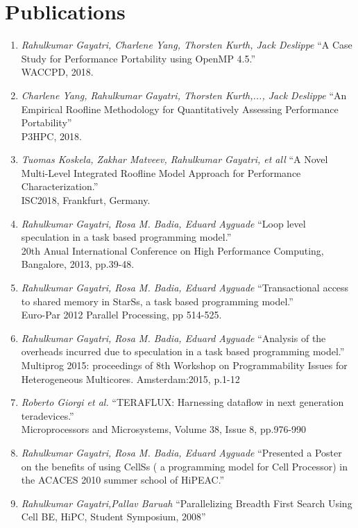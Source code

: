 \documentclass[margin]{res}
\begin{document}
\begin{resume}
\begin{center}
\begin{tabular} {|p{1cm} |p{2cm}|p{1cm}|p{3cm}|p{4cm}|  }
        \end{tabular}
    \end{center}

\section{Publications}

\begin{enumerate}
	   \item \textit{Rahulkumar Gayatri, Charlene Yang, Thorsten Kurth, Jack Deslippe}
			 \enquote{A Case Study for Performance Portability using OpenMP 4.5.} \\
             WACCPD, 2018.
%
	   \item \textit{ Charlene Yang, Rahulkumar Gayatri, Thorsten Kurth,..., Jack Deslippe}
			 \enquote{An Empirical Roofline Methodology for Quantitatively Assessing Performance Portability} \\
             P3HPC, 2018.
%
	   \item \textit{Tuomas Koskela, Zakhar Matveev, Rahulkumar Gayatri, et all}
			 \enquote{A Novel Multi-Level Integrated Roofline Model Approach for Performance Characterization.} \\
             ISC2018, Frankfurt, Germany.
%
	   \item \textit{Rahulkumar Gayatri, Rosa M. Badia, Eduard Ayguade}
			 \enquote{Loop level speculation in a task based programming model.} \\
             20th Anual International Conference on High Performance Computing, Bangalore, 2013, pp.39-48.
%
	   \item \textit{Rahulkumar Gayatri, Rosa M. Badia, Eduard Ayguade}
			 \enquote{Transactional access to shared memory in StarSs, a task based programming model.} \\
             Euro-Par 2012 Parallel Processing, pp 514-525.
%
	   \item \textit{Rahulkumar Gayatri, Rosa M. Badia, Eduard Ayguade}
			 \enquote{Analysis of the overheads incurred due to speculation in a task based programming model.} \\
             Multiprog 2015: proceedings of 8th Workshop on Programmability Issues for Heterogeneous Multicores. Amsterdam:2015, p.1-12
%
	   \item \textit{Roberto Giorgi et al.}
			 \enquote{TERAFLUX: Harnessing dataflow in next generation teradevices.} \\
             Microprocessors and Microsystems, Volume 38, Issue 8, pp.976-990
%
	   \item \textit{Rahulkumar Gayatri, Rosa M. Badia, Eduard Ayguade}
			 \enquote{Presented a Poster on the benefits of using CellSs ( a programming model for Cell Processor) in the ACACES 2010 summer school of HiPEAC.}
%
	   \item \textit{Rahulkumar Gayatri,Pallav Baruah} \enquote{Parallelizing Breadth First Search Using Cell BE, HiPC, Student Symposium, 2008}
%
\end {enumerate}
%

\end{resume}
\end{document}
